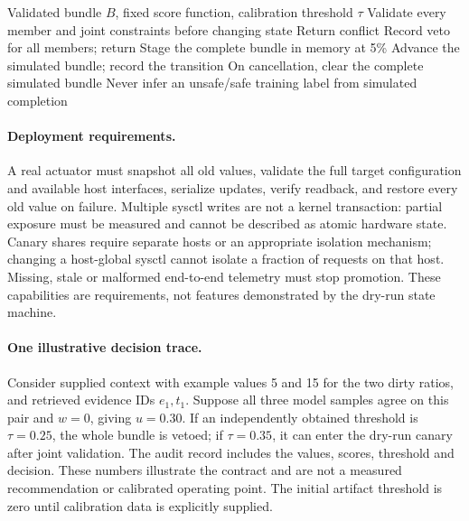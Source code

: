 \begin{algorithm}[t]
\caption{Implemented dry-run bundle path}
\label{alg:control-loop}
\begin{algorithmic}[1]
\REQUIRE Validated bundle $B$, fixed score function, calibration threshold $\tau$
\STATE Validate every member and joint constraints before changing state
  \STATE Return conflict
\ENDIF
{}
  \STATE Record veto for all members; return
\ENDIF
\STATE Stage the complete bundle in memory at 5\%
  \STATE Advance the simulated bundle; record the transition
\ENDFOR
\STATE On cancellation, clear the complete simulated bundle
\STATE Never infer an unsafe/safe training label from simulated completion
\end{algorithmic}
\end{algorithm}

\paragraph{Deployment requirements.}
A real actuator must snapshot all old values, validate the full target configuration and available host interfaces, serialize updates, verify readback, and restore every old value on failure. Multiple sysctl writes are not a kernel transaction: partial exposure must be measured and cannot be described as atomic hardware state. Canary shares require separate hosts or an appropriate isolation mechanism; changing a host-global sysctl cannot isolate a fraction of requests on that host. Missing, stale or malformed end-to-end telemetry must stop promotion. These capabilities are requirements, not features demonstrated by the dry-run state machine.

\paragraph{One illustrative decision trace.}
Consider supplied context with example values 5 and 15 for the two dirty ratios, and retrieved evidence IDs $e_1,t_1$. Suppose all three model samples agree on this pair and $w=0$, giving $u=0.30$. If an independently obtained threshold is $\tau=0.25$, the whole bundle is vetoed; if $\tau=0.35$, it can enter the dry-run canary after joint validation. The audit record includes the values, scores, threshold and decision. These numbers illustrate the contract and are not a measured recommendation or calibrated operating point. The initial artifact threshold is zero until calibration data is explicitly supplied.

